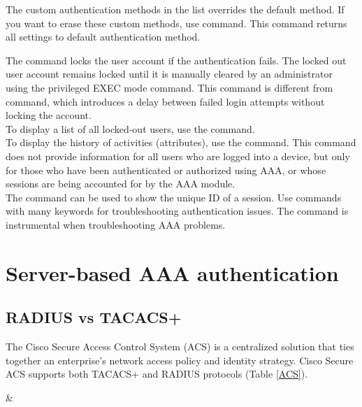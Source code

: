 \note The custom authentication methods in the list  overrides the default method. If you want to erase these custom methods, use  command. This command returns all settings to default authentication method.

The  command locks the user account if the authentication fails. The locked out user account remains locked until it is manually cleared by an administrator using the  privileged EXEC mode command. This command is different from  command, which introduces a delay between failed login attempts without locking the account.\\

To display a list of all locked-out users, use the  command. \\

To display the history of activities (attributes), use the  command. This command does not provide information for all users who are logged into a device, but only for those who have been authenticated or authorized using AAA, or whose sessions are being accounted for by the AAA module.\\

The  command can be used to show the unique ID of a session. Use  commands with many keywords for troubleshooting authentication issues. The  command is instrumental when troubleshooting AAA problems. 

\section{Server-based AAA authentication}

\subsection{RADIUS vs TACACS+}

The Cisco Secure Access Control System (ACS) is a centralized solution that ties together an enterprise’s network access policy and identity strategy. Cisco Secure ACS supports both TACACS+ and RADIUS protocols (Table \ref{ACS}).

 &  \\
\hline

